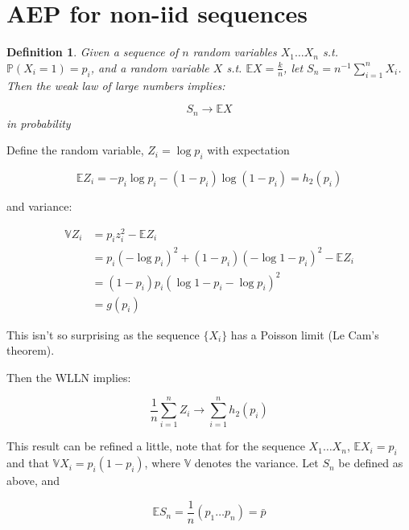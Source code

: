 \documentclass[11pt]{article}
\newtheorem{definition}{Definition}[section]
\begin{document}
\section{AEP for non-iid sequences}
\begin{definition}
Given a sequence of \(n\) random variables \(X_1\ldots X_n\) s.t. \(\mathbb{P}\left(X_i = 1\right) = p_i\), and a random variable \(X\) s.t. \(\mathbb{E}X = \frac{k}{n}\), let \(S_n = n^{-1}\sum_{i=1}^n X_i\). Then the weak law of large numbers implies:

\begin{equation}
S_n \rightarrow \mathbb{E}X
\end{equation}
in probability
\end{definition}

Define the random variable, \(Z_i = \log{p_i}\) with expectation 

\begin{equation}
\mathbb{E}Z_i = -p_i\log{p_i} -\left(1-p_i\right)\log{\left(1-p_i\right)} = h_2\left(p_i\right) 
\end{equation}

and variance:

\begin{align}
\mathbb{V}Z_i & = p_i z_i^2 - \mathbb{E}Z_i \\ 
&= p_i\left(-\log{p_i}\right)^2 + \left(1-p_i\right)\left(-\log{1-p_i}\right)^2 -\mathbb{E}Z_i \\ 
&= \left(1-p_i\right)p_i\left(\log{1-p_i} - \log{p_i}\right)^2\\
&= g\left(p_i\right)
\label{entropyvar}
\end{align}

This isn't so surprising as the sequence \(\{X_i\}\) has a Poisson limit (Le Cam's theorem).

Then the WLLN implies:

\begin{equation}
\frac{1}{n}\sum_{i=1}^n Z_i \rightarrow \sum_{i=1}^n h_2\left(p_i\right)
\end{equation}

This result can be refined a little, note that for the sequence \(X_1 \ldots X_n\), \(\mathbb{E}X_i = p_i\) and that \(\mathbb{V}X_i = p_i\left(1-p_i\right)\), where \(\mathbb{V}\) denotes the variance. Let \(S_n\) be defined as above, and 

\begin{equation}
\mathbb{E}S_n = \frac{1}{n} \left(p_1 \ldots p_n\right) = \bar{p}
\end{equation}
\end{document}
